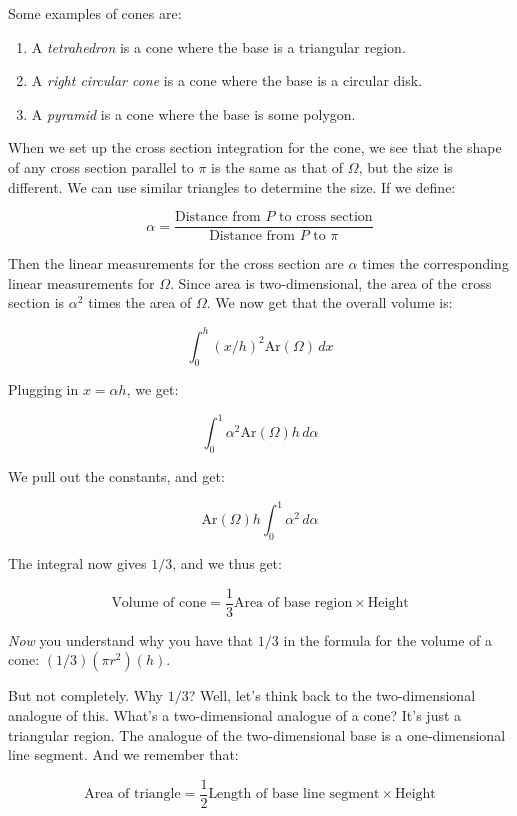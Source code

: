 \documentclass[10pt]{amsart}
\begin{document}
Some examples of cones are:

\begin{enumerate}
\item A {\em tetrahedron} is a cone where the base is a triangular region.
\item A {\em right circular cone} is a cone where the base is a
  circular disk.
\item A {\em pyramid} is a cone where the base is some polygon.
\end{enumerate}

When we set up the cross section integration for the cone, we see that
the shape of any cross section parallel to $\pi$ is the same as that
of $\Omega$, but the size is different. We can use similar triangles
to determine the size. If we define:

$$\alpha = \frac{\text{Distance from $P$ to cross section}}{\text{Distance from $P$ to $\pi$}}$$

Then the linear measurements for the cross section are $\alpha$ times
the corresponding linear measurements for $\Omega$. Since area is
two-dimensional, the area of the cross section is $\alpha^2$ times the
area of $\Omega$. We now get that the overall volume is:

$$\int_0^h (x/h)^2 \text{Ar}(\Omega) \, dx$$

Plugging in $x = \alpha h$, we get:

$$\int_0^1 \alpha^2 \text{Ar}(\Omega) h \, d\alpha$$

We pull out the constants, and get:

$$\text{Ar}(\Omega) h \int_0^1 \alpha^2 \, d\alpha$$

The integral now gives $1/3$, and we thus get:

\begin{equation*}
  \text{Volume of cone} = \frac{1}{3} \text{Area of base region} \times \text{Height}
\end{equation*}

{\em Now} you understand why you have that $1/3$ in the formula for
the volume of a cone: $(1/3) (\pi r^2)(h)$.

But not completely. Why $1/3$? Well, let's think back to the
two-dimensional analogue of this. What's a two-dimensional analogue of
a cone? It's just a triangular region. The analogue of the
two-dimensional base is a one-dimensional line segment. And we remember that:

\begin{equation*}
  \text{Area of triangle} = \frac{1}{2} \text{Length of base line segment} \times \text{Height}
\end{equation*}
\end{document}
